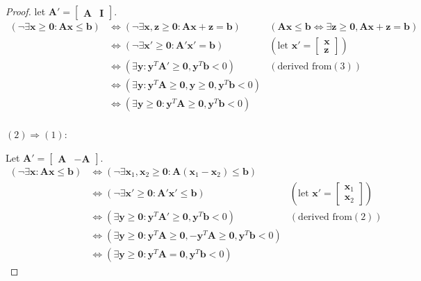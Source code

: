 \begin{proof}
        let $\mathbf{A}'=\left[
        \begin{matrix}
        \mathbf{A} & \mathbf{I}
        \end{matrix}
        \right]$.
        \begin{align*}
        (\neg \exists \mathbf{x}\ge \mathbf{0}: \mathbf{A}\mathbf{x}\le \mathbf{b})&\iff (\neg \exists \mathbf{x},\mathbf{z}\ge \mathbf{0}:\mathbf{A}\mathbf{x}+\mathbf{z}=\mathbf{b}) &(\mathbf{A}\mathbf{x}\le \mathbf{b} \iff \exists \mathbf{z}\ge \mathbf{0},\mathbf{A}\mathbf{x}+\mathbf{z}=\mathbf{b})\\
        &\iff (\neg \exists \mathbf{x}'\ge \mathbf{0}:\mathbf{A}'\mathbf{x}'=\mathbf{b})  &(\text{let }\mathbf{x}'=\left[ \begin{matrix} \mathbf{x} \\ \mathbf{z}\end{matrix} \right])\\
        &\iff (\exists \mathbf{y} :\mathbf{y}^{T}\mathbf{A}'\ge \mathbf{0},\mathbf{y}^{T}\mathbf{b}<0) &(\text{derived from} (3)) \\
        &\iff (\exists \mathbf{y} :\mathbf{y}^{T}\mathbf{A}\ge \mathbf{0},\mathbf{y}\ge \mathbf{0},\mathbf{y}^{T}\mathbf{b}<0) \\
        &\iff (\exists \mathbf{y}\ge \mathbf{0} :\mathbf{y}^{T}\mathbf{A}\ge \mathbf{0},\mathbf{y}^{T}\mathbf{b}<0) \\
        \end{align*}
        
        $(2)\Rightarrow(1)$:
        
        Let $\mathbf{A}'=\left[
        \begin{matrix}
        \mathbf{A} & -\mathbf{A}
        \end{matrix}
        \right]$.
        \begin{align*}
        (\neg \exists \mathbf{x}: \mathbf{A}\mathbf{x}\le \mathbf{b}) &\iff (\neg \exists \mathbf{x}_1,\mathbf{x}_2\ge \mathbf{0}: \mathbf{A}(\mathbf{x}_1-\mathbf{x}_2)\le \mathbf{b}) \\
        &\iff (\neg \exists \mathbf{x}'\ge \mathbf{0}: \mathbf{A}'\mathbf{x}'\le \mathbf{b}) &(\text{let }\mathbf{x}'=\left[ \begin{matrix}\mathbf{x}_1 \\\mathbf{x}_2  \end{matrix} \right])\\
        &\iff (\exists \mathbf{y}\ge \mathbf{0} :\mathbf{y}^{T}\mathbf{A}'\ge \mathbf{0},\mathbf{y}^{T}\mathbf{b}<0) &(\text{derived from} (2)) \\
        &\iff (\exists \mathbf{y}\ge \mathbf{0} :\mathbf{y}^{T}\mathbf{A}\ge \mathbf{0},-\mathbf{y}^{T}\mathbf{A}\ge \mathbf{0},\mathbf{y}^{T}\mathbf{b}<0) \\
        &\iff (\exists \mathbf{y}\ge \mathbf{0} :\mathbf{y}^{T}\mathbf{A}= \mathbf{0},\mathbf{y}^{T}\mathbf{b}<0)
        \end{align*}
    \end{proof}

